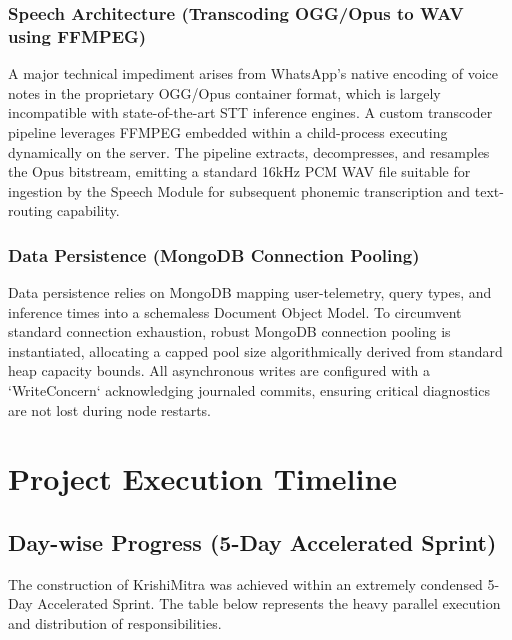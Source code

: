 \documentclass[12pt, a4paper]{report}
\begin{document}
\subsection*{Speech Architecture (Transcoding OGG/Opus to WAV using FFMPEG)}
A major technical impediment arises from WhatsApp's native encoding of voice notes in the proprietary OGG/Opus container format, which is largely incompatible with state-of-the-art STT inference engines. A custom transcoder pipeline leverages FFMPEG embedded within a child-process executing dynamically on the server. The pipeline extracts, decompresses, and resamples the Opus bitstream, emitting a standard 16kHz PCM WAV file suitable for ingestion by the Speech Module for subsequent phonemic transcription and text-routing capability.

\subsection*{Data Persistence (MongoDB Connection Pooling)}
Data persistence relies on MongoDB mapping user-telemetry, query types, and inference times into a schemaless Document Object Model. To circumvent standard connection exhaustion, robust MongoDB connection pooling is instantiated, allocating a capped pool size algorithmically derived from standard heap capacity bounds. All asynchronous writes are configured with a `WriteConcern` acknowledging journaled commits, ensuring critical diagnostics are not lost during node restarts.

\chapter{Project Execution Timeline}

\section{Day-wise Progress (5-Day Accelerated Sprint)}
The construction of KrishiMitra was achieved within an extremely condensed 5-Day Accelerated Sprint. The table below represents the heavy parallel execution and distribution of responsibilities.
\end{document}
